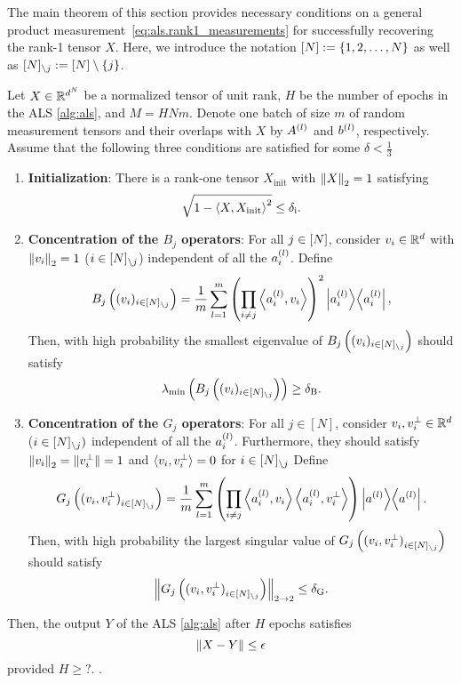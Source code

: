The main theorem of this section provides necessary conditions on a general product measurement~\eqref{eq:als.rank1_measurements} for successfully recovering the rank-1 tensor $X$.
Here, we introduce the notation $[N] := \{1, 2, \ldots, N\}$ as well as $[N]_{\setminus {j}} := [N] \setminus \{j\}$.
\begin{theorem}%
  \label{thm:ana.conditions}
  Let $X \in {\mathbb{R}}^{d^N}$ be a normalized tensor of unit rank, $H$ be the number of epochs in the ALS \cref{alg:als}, and $M = HNm$.
  Denote one batch of size $m$ of random measurement tensors and their overlaps with $X$ by $A^{(l)}$ and $b^{(l)}$, respectively.
  Assume that the following three conditions are satisfied for some $\delta < \frac{1}{3}$
  \begin{enumerate}
    \item\label{lbl:conditions.init}\textbf{Initialization}:
      There is a rank-one tensor $X_\mathrm{init}$ with ${\left\Vert X\right\Vert}_{2} = 1$ satisfying
      \[
        \label{eq:ana.conditions.init}
        \sqrt{1 - \Braket{X, X_\mathrm{init}}^2} \le \delta_\mathrm{i}.
      \]
    \item\label{lbl:conditions.B}\textbf{Concentration of the $B_j$ operators}:
      For all $j \in [N]$, consider $v_i \in {\mathbb{R}}^d$ with ${\Vert v_i\Vert}_2 = 1$ ($i \in [N]_{\setminus {j}}$) independent of all the $a^{(l)}_i$.
      Define
      \[
        \label{eq:ana.conditions.B}
        B_j\left((v_i)_{i \in [N]_{\setminus {j}}}\right)
        = \frac{1}{m} \sum_{l=1}^m \left( \prod_{i\neq j} \Braket{a^{(l)}_i, v_i} \right)^2 \left| a_i^{(l)} \middle\rangle\middle\langle a_i^{(l)} \right|,
      \]
      Then, with high probability the smallest eigenvalue of $B_j\left((v_i)_{i \in [N]_{\setminus {j}}}\right)$ should satisfy
      \[
        \label{eq:ana.conditions.lmin}
        \lambda_\mathrm{min}\left(B_j\left((v_i)_{i \in [N]_{\setminus {j}}}\right)\right) \ge \delta_\mathrm{B}.
      \]
    \item\label{lbl:conditions.G}\textbf{Concentration of the $G_j$ operators}:
      For all $j \in [N]$, consider $v_i, v_i^\perp \in {\mathbb{R}}^d$ ($i \in [N]_{\setminus {j}})$ independent of all the $a^{(l)}_i$.
      Furthermore, they should satisfy ${\Vert v_i\Vert}_2 = {\Vert v_i^\perp\Vert}= 1$ and $\braket{v_i, v_i^\perp} = 0$ for $i\in[N]_{\setminus {j}}$
      Define
      \[
        \label{eq:ana.conditions.G}
        G_j\left({(v_i, v_i^\perp)}_{i \in [N]_{\setminus {j}}} \right)
        = \frac{1}{m} \sum_{l=1}^m \left( \prod_{i\neq j} \Braket{a^{(l)}_i, v_i} \Braket{a^{(l)}_i, v_i^\perp} \right) \left| a^{(l)} \middle\rangle\middle\langle a^{(l)} \right|.
      \]
      Then, with high probability the largest singular value of $G_j\left({(v_i, v_i^\perp)}_{i \in [N]_{\setminus {j}}} \right)$ should satisfy
      \[
        \label{eq:ana.conditions.lmax}
        {\left\Vert G_j\left({(v_i, v_i^\perp)}_{i \in [N]_{\setminus {j}}} \right)\right\Vert}_{2 \to 2} \le \delta_\mathrm{G}.
      \]
  \end{enumerate}
  Then, the output $Y$ of the ALS \cref{alg:als} after $H$ epochs satisfies
  \[
    {\Vert X - Y\Vert} \le \epsilon
  \]
  provided $H \ge ?$.
  .
\end{theorem}

